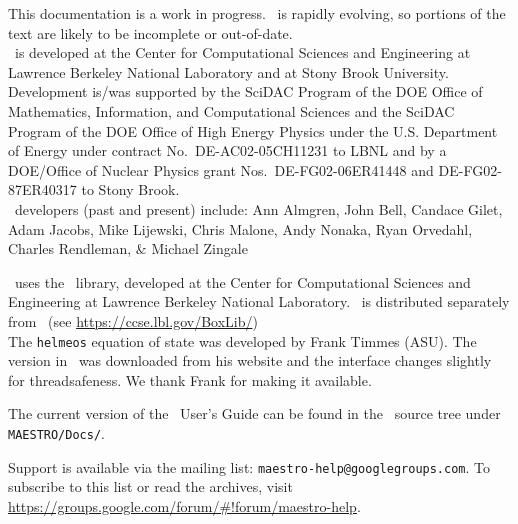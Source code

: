 This documentation is a work in progress.  \maestro\ is rapidly
evolving, so portions of the text are likely to be incomplete or
out-of-date. \\

\noindent \maestro\ is developed at the Center for Computational Sciences and
Engineering at Lawrence Berkeley National Laboratory and at Stony
Brook University.  Development is/was supported by the SciDAC Program of
the DOE Office of Mathematics, Information, and Computational Sciences
and the SciDAC Program of the DOE Office of High Energy Physics under
the U.S. Department of Energy under contract No.\ DE-AC02-05CH11231 to
LBNL and by a DOE/Office of Nuclear Physics grant Nos.\
DE-FG02-06ER41448 and DE-FG02-87ER40317 to Stony Brook.  \\

\noindent \maestro\ developers (past and present) include: Ann Almgren, John
Bell, Candace Gilet, Adam Jacobs, Mike Lijewski, Chris Malone, Andy
Nonaka, Ryan Orvedahl, Charles Rendleman, \& Michael Zingale

\noindent \maestro\ uses the \boxlib\ library,
developed at the Center for Computational Sciences and Engineering at
Lawrence Berkeley National Laboratory.  \boxlib\ is distributed
separately from \maestro\ (see
\url{https://ccse.lbl.gov/BoxLib/})
\\

\noindent The {\tt helmeos} equation of state was developed by Frank Timmes (ASU).
The version in \maestro\ was downloaded from his website and the
interface changes slightly for threadsafeness.  We thank Frank for
making it available.

\noindent The current version of the \maestro\ User's Guide can be found in 
the \maestro\ source tree under {\tt MAESTRO/Docs/}.


\noindent Support is available via the mailing list: {\tt maestro-help@googlegroups.com}.  To subscribe to this list or read the archives, visit
\url{https://groups.google.com/forum/#!forum/maestro-help}.
